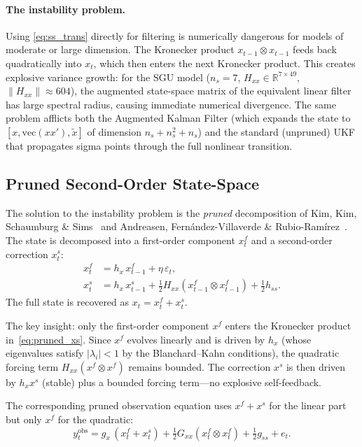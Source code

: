 \documentclass[11pt,a4paper]{article}
\theoremstyle{definition}
\begin{document}
	\paragraph{The instability problem.}
	Using \eqref{eq:ss_trans} directly for filtering is numerically dangerous for models of moderate or large dimension.
	The Kronecker product $x_{t-1} \otimes x_{t-1}$ feeds back quadratically into $x_t$, which then enters the next Kronecker product.
	This creates explosive variance growth: for the SGU model ($n_s = 7$, $H_{xx} \in \mathbb{R}^{7 \times 49}$, $\|H_{xx}\| \approx 604$), the augmented state-space matrix of the equivalent linear filter has large spectral radius, causing immediate numerical divergence.
	The same problem afflicts both the Augmented Kalman Filter (which expands the state to $[x, \text{vec}(xx'), \tilde{x}]$ of dimension $n_s + n_s^2 + n_s$) and the standard (unpruned) UKF that propagates sigma points through the full nonlinear transition.
	
	\subsection{Pruned Second-Order State-Space}
	\label{sec:pruned_ss}
	
	The solution to the instability problem is the \emph{pruned} decomposition of Kim, Kim, Schaumburg \& Sims~\cite{kim2008calculating} and Andreasen, Fern\'{a}ndez-Villaverde \& Rubio-Ram\'{i}rez~\cite{andreasen2018pruning}.
	The state is decomposed into a first-order component $x^f_t$ and a second-order correction $x^s_t$:
	\begin{align}
		x^f_t &= h_x \, x^f_{t-1} + \eta\, \varepsilon_t, \label{eq:pruned_xf}\\
		x^s_t &= h_x \, x^s_{t-1} + \tfrac{1}{2} H_{xx}(x^f_{t-1} \otimes x^f_{t-1}) + \tfrac{1}{2} h_{ss}. \label{eq:pruned_xs}
	\end{align}
	The full state is recovered as $x_t = x^f_t + x^s_t$.
	
	The key insight: only the first-order component $x^f$ enters the Kronecker product in~\eqref{eq:pruned_xs}.
	Since $x^f$ evolves linearly and is driven by $h_x$ (whose eigenvalues satisfy $|\lambda_i| < 1$ by the Blanchard--Kahn conditions), the quadratic forcing term $H_{xx}(x^f \otimes x^f)$ remains bounded.
	The correction $x^s$ is then driven by $h_x x^s$ (stable) plus a bounded forcing term---no explosive self-feedback.
	
	The corresponding pruned observation equation uses $x^f + x^s$ for the linear part but only $x^f$ for the quadratic:
	\begin{equation}\label{eq:pruned_obs}
		y_t^{\mathrm{obs}} = g_x\,(x^f_t + x^s_t) + \tfrac{1}{2} G_{xx}(x^f_t \otimes x^f_t) + \tfrac{1}{2} g_{ss} + e_t.
	\end{equation}
	
\end{document}
